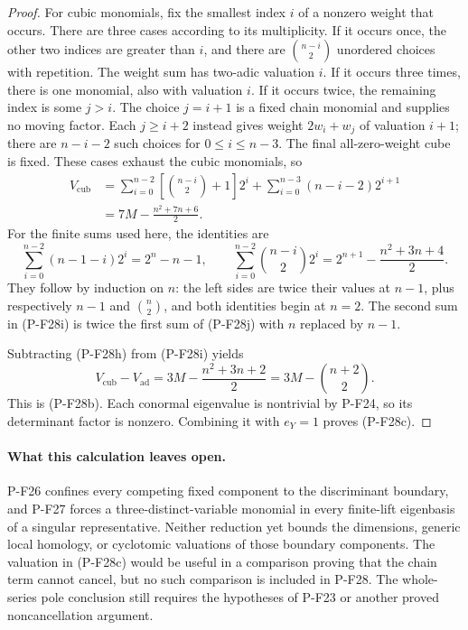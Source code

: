 \documentclass[11pt,a4paper]{article}
\begin{document}
\begin{proof}
For cubic monomials, fix the smallest index $i$
of a nonzero weight that occurs. There are three
cases according to its multiplicity. If it occurs
once, the other two indices are greater than $i$,
and there are $\binom{n-i}{2}$ unordered choices
with repetition. The weight sum has two-adic
valuation $i$. If it occurs three times, there is
one monomial, also with valuation $i$.
If it occurs twice, the remaining index is some
$j>i$. The choice $j=i+1$ is a fixed chain
monomial and supplies no moving factor. Each
$j\ge i+2$ instead gives weight $2w_i+w_j$ of
valuation $i+1$; there are $n-i-2$ such choices
for $0\le i\le n-3$. The final all-zero-weight
cube is fixed. These cases exhaust the cubic
monomials, so
\begin{align*}
 V_{\mathrm{cub}}
 &=\sum_{i=0}^{n-2}
        \left[\binom{n-i}{2}+1\right]2^i
      +\sum_{i=0}^{n-3}(n-i-2)2^{i+1}\\
 &=7M-\frac{n^2+7n+6}{2}.
 \tag{P-F28i}
\end{align*}
For the finite sums used here, the identities are
\[
 \sum_{i=0}^{n-2}(n-1-i)2^i=2^n-n-1,\qquad
 \sum_{i=0}^{n-2}\binom{n-i}{2}2^i
    =2^{n+1}-\frac{n^2+3n+4}{2}.
 \tag{P-F28j}
\]
They follow by induction on $n$: the left sides
are twice their values at $n-1$, plus respectively
$n-1$ and $\binom n2$, and both identities begin
at $n=2$. The second sum in (P-F28i) is twice the
first sum of (P-F28j) with $n$ replaced by $n-1$.

Subtracting (P-F28h) from (P-F28i) yields
\[
 V_{\mathrm{cub}}-V_{\mathrm{ad}}
     =3M-\frac{n^2+3n+2}{2}
     =3M-\binom{n+2}{2}.
 \tag{P-F28k}
\]
This is (P-F28b). Each conormal eigenvalue is
nontrivial by P-F24, so its determinant factor
is nonzero. Combining it with $e_Y=1$ proves
(P-F28c).
\end{proof}

\paragraph{What this calculation leaves open.}
P-F26 confines every competing fixed component to
the discriminant boundary, and P-F27 forces a
three-distinct-variable monomial in every finite-lift
eigenbasis of a singular representative.
Neither reduction yet bounds the dimensions,
generic local homology, or cyclotomic valuations
of those boundary components. The valuation in
(P-F28c) would be useful in a comparison proving
that the chain term cannot cancel, but no such
comparison is included in P-F28. The whole-series
pole conclusion still requires the hypotheses of
P-F23 or another proved noncancellation argument.
\end{document}
